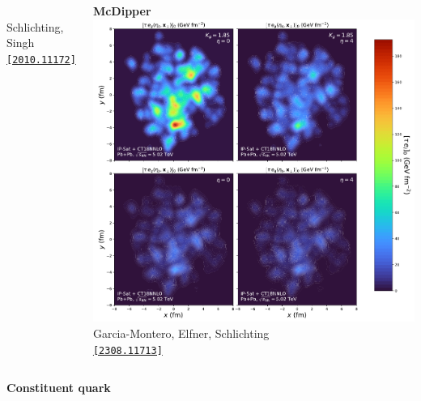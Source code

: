 \documentclass[aspectratio=169,11pt,usenames,dvipsnames]{beamer}
\begin{document}
\begin{frame}[noframenumbering]
{\begin{columns}[onlytextwidth,c]
\begin{center}
                \\[-4pt]
                {\tiny Schlichting, Singh} \\ \tiny \href{https://arxiv.org/abs/2010.11172}{\color{jyured}\texttt{[2010.11172]}\scalebox{.6}{$^\text{\tiny\faExternalLink}$}}
            \end{center}
            \begin{center}
                {\scriptsize\bfseries McDipper}
                \\[1pt]
                \includegraphics[width=0.65\columnwidth]{images/Event_IPSat_PbPb_5020_energies_crop.pdf}
                \\[-4pt]
                {\tiny Garcia-Montero, Elfner, Schlichting} \\ \tiny \href{https://arxiv.org/abs/2308.11713}{\color{jyured}\texttt{[2308.11713]}\scalebox{.6}{$^\text{\tiny\faExternalLink}$}}
            \end{center}
    \end{columns}    
    \vspace{-10pt} 
    \begin{columns}[onlytextwidth,c]
            \begin{center}
                {\scriptsize\bfseries Constituent quark}
                \\[1pt]

\end{center}
\end{columns}}
\end{frame}
\end{document}

